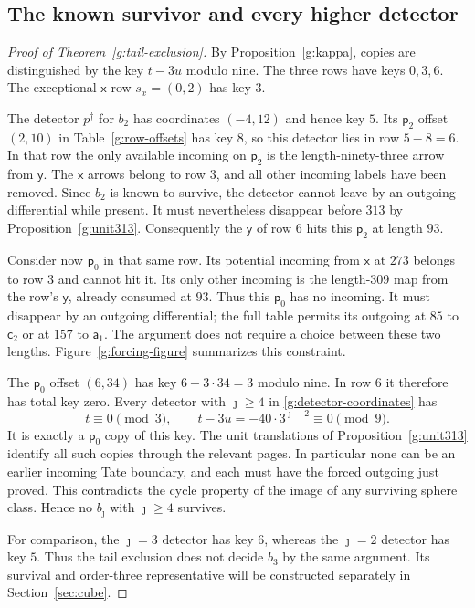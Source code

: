 \subsection{The known survivor and every higher detector}

\begin{proof}[Proof of Theorem~\ref{g:tail-exclusion}]
By Proposition~\ref{g:kappa}, copies are distinguished
by the key $t-3u$ modulo nine.  The three rows have
keys $0,3,6$.  The exceptional $\mathsf x$ row
$s_x=(0,2)$ has key $3$.

The detector $p^\dagger$ for $b_2$ has coordinates
$(-4,12)$ and hence key $5$.  Its $\mathsf p_2$
offset $(2,10)$ in Table~\ref{g:row-offsets} has
key $8$, so this detector lies in row $5-8=6$.
In that row the only available incoming on
$\mathsf p_2$ is the length-ninety-three arrow
from $\mathsf y$.  The $\mathsf x$ arrows
belong to row $3$, and all other incoming
labels have been removed.  Since $b_2$ is
known to survive, the detector cannot leave
by an outgoing differential while present.
It must nevertheless disappear before $313$
by Proposition~\ref{g:unit313}.  Consequently
the $\mathsf y$ of row $6$ hits this
$\mathsf p_2$ at length $93$.

Consider now $\mathsf p_0$ in that same row.
Its potential incoming from $\mathsf x$ at
$273$ belongs to row $3$ and cannot hit it.
Its only other incoming is the length-$309$
map from the row's $\mathsf y$, already
consumed at $93$.  Thus this $\mathsf p_0$
has no incoming.  It must disappear by an
outgoing differential; the full table permits
its outgoing at $85$ to $\mathsf c_2$ or
at $157$ to $\mathsf a_1$.  The argument does
not require a choice between these two
lengths. Figure~\ref{g:forcing-figure} summarizes this constraint.



The $\mathsf p_0$ offset $(6,34)$ has key
$6-3\cdot34=3$ modulo nine.  In row $6$ it
therefore has total key zero.  Every
detector with $\jmath\ge4$ in
\eqref{g:detector-coordinates} has
\[
 t\equiv0\pmod3,\qquad
 t-3u=-40\cdot3^{\jmath-2}\equiv0\pmod9.
\]
It is exactly a $\mathsf p_0$ copy of this
key.  The unit translations of
Proposition~\ref{g:unit313} identify all such
copies through the relevant pages.  In
particular none can be an earlier incoming
Tate boundary, and each must have the forced
outgoing just proved.  This contradicts the
cycle property of the image of any surviving
sphere class.  Hence no $b_{\jmath}$ with
$\jmath\ge4$ survives.

For comparison, the $\jmath=3$ detector has
key $6$, whereas the $\jmath=2$ detector has
key $5$.  Thus the tail exclusion does not
decide $b_3$ by the same argument.  Its
survival and order-three representative
will be constructed separately in
Section~\ref{sec:cube}.
\end{proof}
